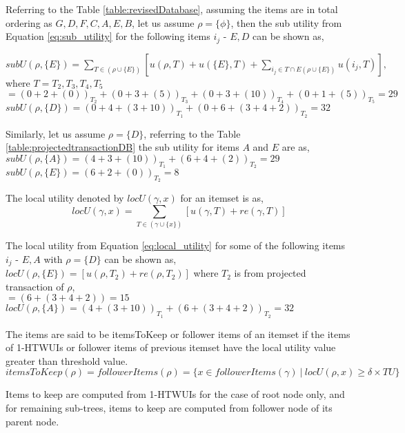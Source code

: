 \documentclass[11pt,openright]{report}
\begin{document}
Referring to the Table \ref{table:revisedDatabase}, assuming the items are in total ordering as $G, D, F, C, A, E, B$, let us assume $\rho = \{\phi\}$, then the sub utility from Equation \ref{eq:sub_utility} for the following items $i_j$ - $E, D$ can be shown as,

$subU(\rho, \{E\})  = \sum_{T \in (\rho \cup \{E\})} [u(\rho,T) + u(\{E\},T) + \sum_{i_j \in T \cap E(\rho \cup \{E\})}u(i_j,T)],$ where $T = T_2, T_3, T_4, T_5$ \\
\indent \indent$= (0 + 2 + (0))_{T_2} + (0 + 3 + (5))_{T_3} + (0 + 3 + (10))_{T_4} + (0 + 1 + (5))_{T_5} = 29$
\\ \indent$subU(\rho, \{D\})  = (0 + 4 + (3 + 10))_{T_1} + (0 + 6 + (3 + 4 + 2))_{T_2} = 32$

Similarly, let us assume $\rho = \{D\}$, referring to the Table \ref{table:projectedtransactionDB} the sub utility for items $A$ and $E$ are as,\\
\indent$subU(\rho, \{A\})  = (4 + 3 + (10))_{T_1} + (6 + 4 + (2))_{T_2} = 29$\\
\indent$subU(\rho, \{E\})  = (6 + 2 + (0))_{T_2} = 8$

\begin{definition}
	The local utility denoted by $locU(\gamma, x)$ for an itemset is as, 
	\begin{equation}
	locU(\gamma, x) = \sum_{T \in (\gamma \cup 	\{x\})}[u(\gamma, T) + re(\gamma, T)]		\label{eq:local_utility}
	\end{equation}
\end{definition}
The local utility from Equation \ref{eq:local_utility} for some of the following items $i_j$ - $E, A$ with $\rho = \{D\}$ can be shown as,\\
\indent $locU(\rho, \{E\}) =  [u(\rho, T_2) + re(\rho, T_2)]$ where $T_2$ is from projected transaction of $\rho$,
 \\\indent \indent $= (6 + (3 + 4 + 2)) = 15 $
\\
\indent $locU(\rho, \{A\}) = (4 + (3 + 10))_{T_1} + (6 + (3 + 4 + 2))_{T_2} = 32$

\begin{definition}
	The items are said to be itemsToKeep or follower items of an itemset if the items of 1-HTWUIs or follower items of previous itemset have the local utility value greater than threshold value.
	\begin{equation}
	itemsToKeep(\rho) = followerItems(\rho) = \{x \in followerItems(\gamma)\ |\ locU(\rho, x) \geq \delta \times TU\}
	\label{eq:itemsToKeep}
	\end{equation}
		\label{def:itemsToKeep}
\end{definition}
Items to keep are computed from 1-HTWUIs for the case of root node only, and for remaining sub-trees, items to keep are computed from follower node of its parent node.
	
\end{document}
